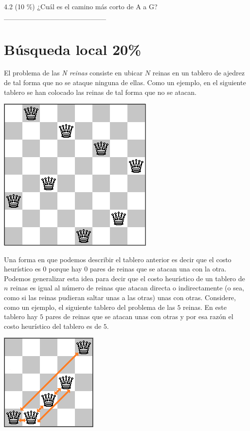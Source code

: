 \documentclass[twocolumn]{article}
\begin{document}
4.2 (10 \%) ¿Cuál es el camino más corto de A a G?\\

  \_\_\_\_\_\_\_\_\_\_\_\_\_\_\_\_\_\_\_\_


\section{Búsqueda local 20\%}
El problema de las \textit{N reinas} consiste en ubicar
$N$ reinas en un tablero de ajedrez de tal forma que no
se ataque ninguna de ellas. Como un ejemplo, en el siguiente
tablero se han colocado las reinas de tal forma que no se atacan.

\begin{center}
\includegraphics[scale=0.3]{8qsolved.png}
\end{center}

Una forma en que podemos describir el tablero anterior es decir que
el costo heurístico es $0$ porque hay $0$ pares de reinas que se atacan
una con la otra. Podemos generalizar esta idea para decir que el costo
heurístico de un tablero de $n$ reinas es igual al número de reinas
que atacan directa o indirectamente (o sea, como si las reinas pudieran
saltar unas a las otras) unas con otras. Considere, como un ejemplo, el
siguiente tablero del problema de las $5$ reinas. En este tablero hay $5$
pares de reinas que se atacan unas con otras y por esa razón el costo
heurístico del tablero es de $5$.

\begin{center}
\includegraphics[scale=0.6]{5qexample.png}
\end{center}
\end{document}
